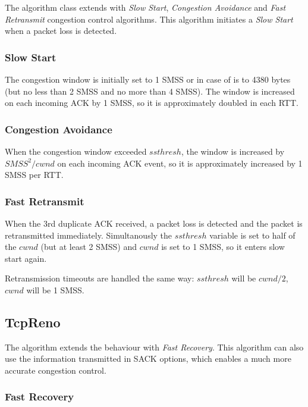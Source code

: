 The  algorithm class extends 
with \emph{Slow Start}, \emph{Congestion Avoidance} and
\emph{Fast Retransmit} congestion control algorithms.
This algorithm initiates a \emph{Slow Start} when a packet
loss is detected.

\subsubsection*{Slow Start}

The congestion window is initially set to 1 SMSS or in case of
 is  to 4380 bytes
(but no less than 2 SMSS and no more than 4 SMSS). The window
is increased on each incoming ACK by 1 SMSS, so it is approximately
doubled in each RTT.

\subsubsection*{Congestion Avoidance}

When the congestion window exceeded $ssthresh$, the window
is increased by $SMSS^2/cwnd$ on each incoming ACK event, so
it is approximately increased by 1 SMSS per RTT.

\subsubsection*{Fast Retransmit}

When the 3rd duplicate ACK received, a packet loss is detected
and the packet is retransmitted immediately. Simultanously
the $ssthresh$ variable is set to half of the $cwnd$ (but at least 2 SMSS)
and $cwnd$ is set to 1 SMSS, so it enters slow start again.

Retransmission timeouts are handled the same way:
$ssthresh$ will be $cwnd/2$, $cwnd$ will be 1 SMSS.

\subsection{TcpReno}

The  algorithm extends the behaviour 
with \emph{Fast Recovery}. This algorithm can also use the information
transmitted in SACK options, which enables a much more accurate
congestion control.

\subsubsection*{Fast Recovery}


